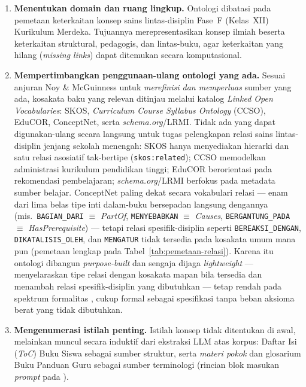 \documentclass[../../thesis]{subfiles}
\begin{document}
\begin{enumerate}
  \item \textbf{Menentukan domain dan ruang lingkup.} Ontologi dibatasi pada
        pemetaan keterkaitan konsep sains lintas-disiplin Fase~F (Kelas~XII)
        Kurikulum Merdeka. Tujuannya merepresentasikan konsep ilmiah beserta
        keterkaitan struktural, pedagogis, dan lintas-buku, agar keterkaitan
        yang hilang (\textit{missing links}) dapat ditemukan secara
        komputasional.

  \item \textbf{Mempertimbangkan penggunaan-ulang ontologi yang ada.} Sesuai
        anjuran Noy \& McGuinness untuk \textit{merefinisi dan memperluas} sumber
        yang ada, kosakata baku yang relevan ditinjau melalui katalog
        \textit{Linked Open Vocabularies}: SKOS, \textit{Curriculum Course
        Syllabus Ontology} (CCSO), EduCOR, ConceptNet, serta
        \textit{schema.org}/LRMI. Tidak ada yang dapat digunakan-ulang secara
        langsung untuk tugas pelengkapan relasi sains lintas-disiplin jenjang
        sekolah menengah: SKOS hanya menyediakan hierarki dan satu relasi
        asosiatif tak-bertipe (\texttt{skos:related}); CCSO memodelkan
        administrasi kurikulum pendidikan tinggi; EduCOR berorientasi pada
        rekomendasi pembelajaran; \textit{schema.org}/LRMI berfokus pada metadata
        sumber belajar. ConceptNet paling dekat secara vokabulari relasi --- enam
        dari lima belas tipe inti dalam-buku bersepadan langsung dengannya (mis.\
        \texttt{BAGIAN\_DARI} $\equiv$ \textit{PartOf}, \texttt{MENYEBABKAN}
        $\equiv$ \textit{Causes}, \texttt{BERGANTUNG\_PADA} $\equiv$
        \textit{HasPrerequisite}) --- tetapi relasi spesifik-disiplin seperti
        \texttt{BEREAKSI\_DENGAN}, \texttt{DIKATALISIS\_OLEH}, dan
        \texttt{MENGATUR} tidak tersedia pada kosakata umum mana pun (pemetaan
        lengkap pada Tabel~\ref{tab:pemetaan-relasi}). Karena itu ontologi
        dibangun \textit{purpose-built} dan sengaja dijaga \textit{lightweight}
        --- menyelaraskan tipe relasi dengan kosakata mapan bila tersedia dan
        menambah relasi spesifik-disiplin yang dibutuhkan --- tetap rendah pada
        spektrum formalitas , cukup formal
        sebagai spesifikasi tanpa beban aksioma berat yang tidak dibutuhkan.

  \item \textbf{Mengenumerasi istilah penting.} Istilah konsep tidak ditentukan
        di awal, melainkan muncul secara induktif dari ekstraksi LLM atas
        korpus: Daftar Isi (\textit{ToC}) Buku Siswa sebagai sumber struktur,
        serta \textit{materi pokok} dan glosarium Buku Panduan Guru sebagai
        sumber terminologi (rincian blok masukan \textit{prompt} pada
        ).


\end{enumerate}
\end{document}

